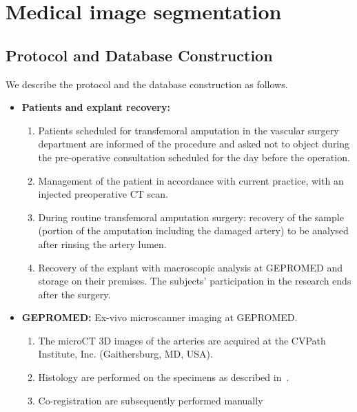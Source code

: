 \chapter{Medical image segmentation}
\label{chap:appendix5}

\tocless\section{Protocol and Database Construction}
\label{anex:protocol_database}
We describe the protocol and the database construction as follows.
\begin{itemize}
    \item \textbf{Patients and explant recovery:}
    \begin{enumerate}
        \item Patients scheduled for transfemoral amputation in the 
        vascular surgery department are informed of the
        procedure and asked not to object during the pre-operative 
        consultation scheduled for the day before the operation.
        \item Management of the patient in
        accordance with current practice, with an injected preoperative CT scan.
        \item During routine transfemoral amputation surgery: recovery of the
        sample (portion of the amputation including the damaged artery) to be
        analysed after rinsing the artery lumen.
        \item Recovery of the explant with macroscopic analysis at GEPROMED and
        storage on their premises. The subjects' participation in the research
        ends after the surgery.
    \end{enumerate}
    \item \textbf{GEPROMED:} Ex-vivo microscanner imaging at GEPROMED.
    \begin{enumerate}
        \item The microCT 3D images of the arteries are acquired at the CVPath Institute,
        Inc. (Gaithersburg, MD, USA).
        \item Histology are performed on the specimens 
    as described in~\cite{torii2019histopathologic}. \label{item:histo}
        \item Co-registration are subsequently performed manually

\end{enumerate}
\end{itemize}
